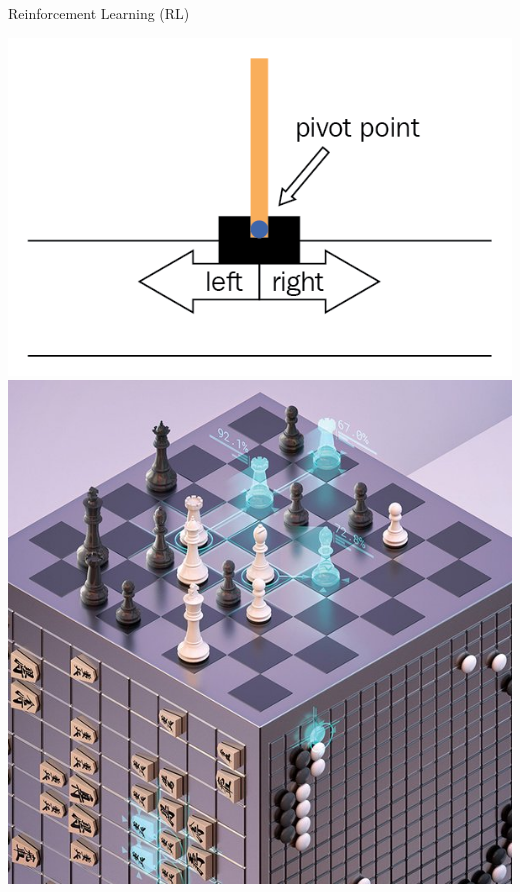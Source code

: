 \documentclass[aspectratio=1610]{beamer}
\begin{document}
\begin{frame}{Reinforcement Learning (RL)}
\begin{itemize}
\begin{minipage}[c]{0.20\textwidth}
			\includegraphics[width=\linewidth]{graphics/cartpole.png}\\[1cm]
			\includegraphics[width=\linewidth]{graphics/alphazero.png}
		\end{minipage}
		\begin{minipage}[c]{0.20\textwidth}

\end{minipage}
\end{itemize}
\end{frame}
\end{document}
